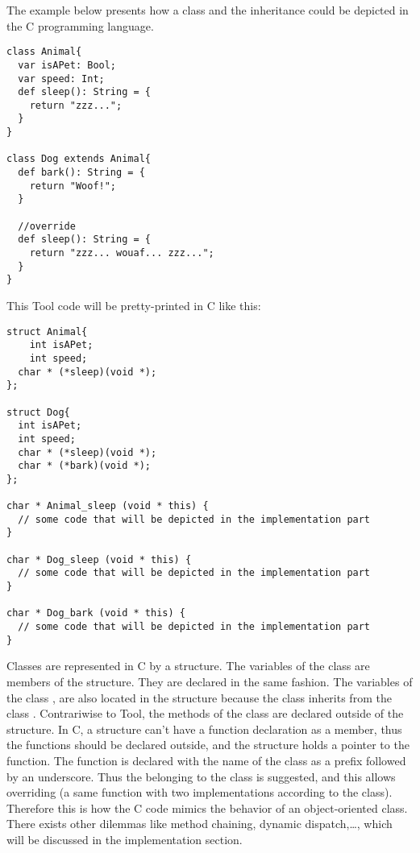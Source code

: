 The example below presents how a class and the inheritance could be depicted in the C programming language.
\lstset{style=customtool}
\begin{lstlisting}
class Animal{
  var isAPet: Bool;
  var speed: Int;
  def sleep(): String = {
    return "zzz...";
  }
}

class Dog extends Animal{
  def bark(): String = {
    return "Woof!";
  }

  //override
  def sleep(): String = {
    return "zzz... wouaf... zzz...";
  }
}
\end{lstlisting}
This Tool code will be pretty-printed in C like this:
\lstset{style=customc}
\begin{lstlisting}
struct Animal{
	int isAPet;
	int speed;
  char * (*sleep)(void *);
};

struct Dog{
  int isAPet;
  int speed;
  char * (*sleep)(void *);
  char * (*bark)(void *);
};

char * Animal_sleep (void * this) {
  // some code that will be depicted in the implementation part
}

char * Dog_sleep (void * this) {
  // some code that will be depicted in the implementation part
}

char * Dog_bark (void * this) {
  // some code that will be depicted in the implementation part
}
\end{lstlisting}
Classes are represented in C by a structure. The variables of the class
are members of the structure. They are declared in the same fashion.
\newline
The variables of the class , are also located in the  structure
because the class  inherits from the class .
\newline
Contrariwise to Tool, the methods of the class are declared outside of the structure.
In C, a structure can't have a function declaration as a member, thus the functions should
be declared outside, and the structure holds a pointer to the function.
\newline
The function is declared with the name of the class as a prefix followed by an underscore.
Thus the belonging to the  class is suggested, and this allows overriding (a same function with two implementations according to the class).
\newline
Therefore this is how the C code mimics the behavior of an object-oriented class.
\newline
There exists other dilemmas like method chaining, dynamic dispatch,\ldots, which will be discussed
in the implementation section.
\newline
